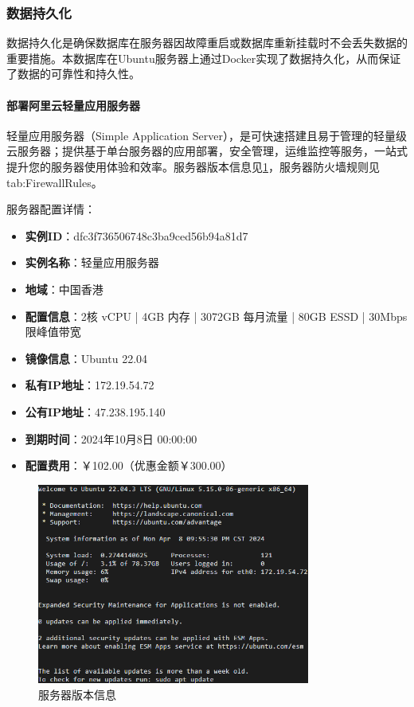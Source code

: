 \subsubsection{数据持久化}

数据持久化是确保数据库在服务器因故障重启或数据库重新挂载时不会丢失数据的重要措施。本数据库在Ubuntu服务器上通过Docker实现了数据持久化，从而保证了数据的可靠性和持久性。

\paragraph{部署阿里云轻量应用服务器}

轻量应用服务器（Simple Application Server），是可快速搭建且易于管理的轻量级云服务器；提供基于单台服务器的应用部署，安全管理，运维监控等服务，一站式提升您的服务器使用体验和效率。服务器版本信息见\cref{fig:ServerVersion}，服务器防火墙规则见{tab:FirewallRules}。

服务器配置详情：

\begin{itemize}
    \item \textbf{实例ID}：dfc3f736506748c3ba9ced56b94a81d7
    \item \textbf{实例名称}：轻量应用服务器
    \item \textbf{地域}：中国香港
    \item \textbf{配置信息}：2核 vCPU | 4GB 内存 | 3072GB 每月流量 | 80GB ESSD | 30Mbps 限峰值带宽
    \item \textbf{镜像信息}：Ubuntu 22.04
    \item \textbf{私有IP地址}：172.19.54.72
    \item \textbf{公有IP地址}：47.238.195.140
    \item \textbf{到期时间}：2024年10月8日 00:00:00
    \item \textbf{配置费用}：￥102.00（优惠金额￥300.00）
\end{itemize}

\begin{figure}[htbp]
    \centering
    \includegraphics[width=0.8\textwidth]{figures/ServerVersion.png}
    \caption{服务器版本信息}
    \label{fig:ServerVersion}
\end{figure}

